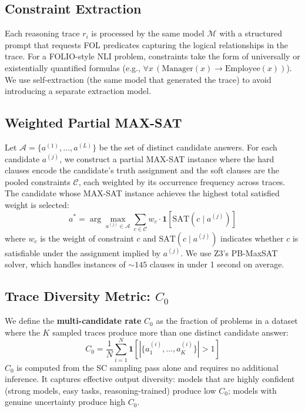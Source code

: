 \documentclass[11pt,a4paper]{article}
\newcommand{\czero}{C_0}
\begin{document}
\subsection{Constraint Extraction}

Each reasoning trace $r_i$ is processed by the same model $\mathcal{M}$ with a structured prompt that requests FOL predicates capturing the logical relationships in the trace.
For a FOLIO-style NLI problem, constraints take the form of universally or existentially quantified formulas (e.g., $\forall x\, (\text{Manager}(x) \to \text{Employee}(x))$).
We use self-extraction (the same model that generated the trace) to avoid introducing a separate extraction model.

\subsection{Weighted Partial MAX-SAT}

Let $\mathcal{A} = \{a^{(1)}, \ldots, a^{(L)}\}$ be the set of distinct candidate answers.
For each candidate $a^{(j)}$, we construct a partial MAX-SAT instance where the hard clauses encode the candidate's truth assignment and the soft clauses are the pooled constraints $\mathcal{C}$, each weighted by its occurrence frequency across traces.
The candidate whose MAX-SAT instance achieves the highest total satisfied weight is selected:
\begin{equation}
  a^* = \arg\max_{a^{(j)} \in \mathcal{A}} \sum_{c \in \mathcal{C}} w_c \cdot \mathbf{1}[\text{SAT}(c \mid a^{(j)})]
\end{equation}
where $w_c$ is the weight of constraint $c$ and $\text{SAT}(c \mid a^{(j)})$ indicates whether $c$ is satisfiable under the assignment implied by $a^{(j)}$.
We use Z3's PB-MaxSAT solver, which handles instances of ${\sim}145$ clauses in under 1 second on average.

\subsection{Trace Diversity Metric: $\czero{}$}

We define the \textbf{multi-candidate rate} $\czero{}$ as the fraction of problems in a dataset where the $K$ sampled traces produce more than one distinct candidate answer:
\begin{equation}
  \czero{} = \frac{1}{N} \sum_{i=1}^{N} \mathbf{1}\!\left[|\{a_1^{(i)}, \ldots, a_K^{(i)}\}| > 1\right]
\end{equation}
$\czero{}$ is computed from the SC sampling pass alone and requires no additional inference.
It captures effective output diversity: models that are highly confident (strong models, easy tasks, reasoning-trained) produce low $\czero{}$; models with genuine uncertainty produce high $\czero{}$.
\end{document}
